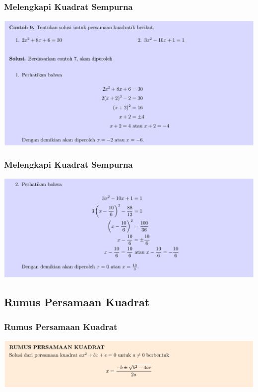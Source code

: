 \documentclass[pdflatex,compress,mathserif]{beamer}
\begin{document}
\begin{frame}
	\frametitle{Melengkapi Kuadrat Sempurna}
	\begin{center}
		\includegraphics[width=\linewidth]{img/img18}
	\end{center}
\end{frame}

\begin{frame}
	\frametitle{Melengkapi Kuadrat Sempurna}
	\begin{center}
		\includegraphics[width=\linewidth]{img/img19}
	\end{center}
\end{frame}

\subsection{Rumus Persamaan Kuadrat}

\begin{frame}
	\frametitle{Rumus Persamaan Kuadrat}
	\begin{center}
		\includegraphics[width=\linewidth]{img/img20}
	\end{center}
\end{frame}
\end{document}

